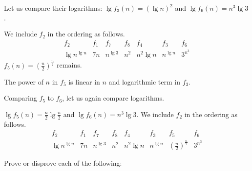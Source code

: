 \documentclass[a4paper]{exam}
\begin{document}
\begin{questions}
\begin{solution}
    Let us compare their logarithms: $\lg f_3(n) = (\lg n)^2$ and $\lg f_6(n) = n^3\lg 3$.

      We include $f_2$ in the ordering as follows.
      \[ \begin{array}{c|c|c|c|c|c|c}
        f_2 & f_1& f_7&f_8&f_4&f_3&f_6\\\hline
        \lg n^{\lg n} & 7n& n^{\lg3}&n^2&n^2\lg n& n^{\lg n} &3^{n^3}
      \end{array} \]
    $f_5(n) = \left(\frac{n}{2}\right)^{\frac{n}{2}}$ remains.

    The power of $n$ in $f_5$ is linear in $n$ and logarithmic term in $f_3$.

    Comparing $f_5$ to $f_6$, let us again compare logarithms.

    $\lg f_5(n) = \frac{n}{2}\lg\frac{n}{2}$ and $\lg f_6(n) = n^3\lg 3$.
      We include $f_2$ in the ordering as follows.
      \[ \begin{array}{c|c|c|c|c|c|c|c}
        f_2 & f_1& f_7&f_8&f_4&f_3&f_5&f_6\\\hline
        \lg n^{\lg n} & 7n& n^{\lg3}&n^2&n^2\lg n& n^{\lg n} &\left(\frac{n}{2}\right)^{\frac{n}{2}}&3^{n^3}
      \end{array} \]
  \end{solution}

\question
  Prove or disprove each of the following:
\end{questions}
\end{document}
